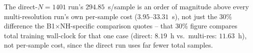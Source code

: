 \documentclass[final,5p,times]{elsarticle}
\begin{document}
The direct-$N{=}1401$ run's $294.85$~s/sample is an order of magnitude
above every multi-resolution run's own per-sample cost ($3.95$--$33.31$~s),
not just the $30\%$ difference the B1$\times$NH-specific comparison
quotes -- that $30\%$ figure compares total training wall-clock for that
one case (direct: $8.19$~h vs.\ multi-res: $11.63$~h), not per-sample
cost, since the direct run uses far fewer total samples.

\renewcommand{\arraystretch}{1}
\twocolumn
\clearpage

\end{document}
